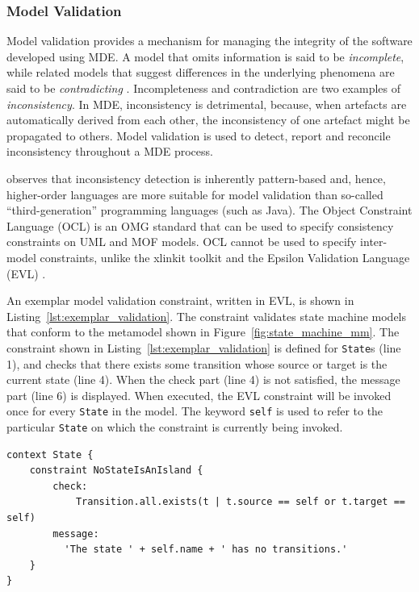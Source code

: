 \subsubsection{Model Validation}
\label{subsubsec:model_validation}
Model validation provides a mechanism for managing the integrity of the software developed using MDE. A model that omits information is said to be \emph{incomplete}, while related models that suggest differences in the underlying phenomena are said to be \emph{contradicting} \cite{kolovos09thesis}. Incompleteness and contradiction are two examples of \emph{inconsistency}. In MDE, inconsistency is detrimental, because, when artefacts are automatically derived from each other, the inconsistency of one artefact might be propagated to others. Model validation is used to detect, report and reconcile inconsistency throughout a MDE process.

\cite{kolovos09thesis} observes that inconsistency detection is inherently pattern-based and, hence, higher-order languages are more suitable for model validation than so-called ``third-generation'' programming languages (such as Java). The Object Constraint Language (OCL) \cite{ocl2} is an OMG standard that can be used to specify consistency constraints on UML and MOF models. OCL cannot be used to specify inter-model constraints, unlike the xlinkit toolkit \cite{nentwich2003flexible} and the Epsilon Validation Language (EVL) \cite{kolovos08evl}.

An exemplar model validation constraint, written in EVL, is shown in Listing~\ref{lst:exemplar_validation}. The constraint validates state machine models that conform to the metamodel shown in Figure~\ref{fig:state_machine_mm}. The constraint shown in Listing~\ref{lst:exemplar_validation} is defined for \texttt{State}s (line 1), and checks that there exists some transition whose source or target is the current state (line 4). When the check part (line 4) is not satisfied, the message part (line 6) is displayed. When executed, the EVL constraint will be invoked once for every \texttt{State} in the model. The keyword \texttt{self} is used to refer to the particular \texttt{State} on which the constraint is currently being invoked.

\begin{lstlisting}[caption={[Model validation in EVL]Model validation in the Epsilon Validation Language}, label=lst:exemplar_validation, language=EVL]
context State {
	constraint NoStateIsAnIsland {
		check:
			Transition.all.exists(t | t.source == self or t.target == self)
		message:
		  'The state ' + self.name + ' has no transitions.'
	}
}
\end{lstlisting}

